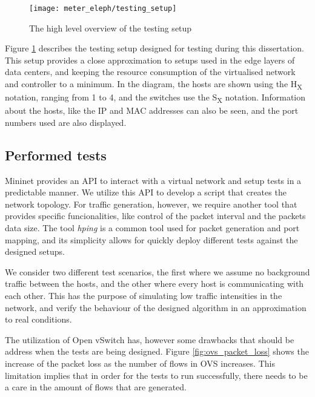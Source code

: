 \pagebreak

\begin{figure} 
    \centering
    \texttt{[image: meter\_eleph/testing\_setup]}
    \caption {The high level overview of the testing setup}
    \label{fig:test_setup}
\end{figure} 

\par Figure \ref{fig:test_setup} describes the testing setup designed for testing during this dissertation. This setup provides a close approximation to setups used in the edge layers of data centers, and keeping the
resource consumption of the virtualised network and controller to a minimum. In the diagram, the hosts are shown using the H\textsubscript{X} notation, ranging from 1 to 4, and the switches use the S\textsubscript{X} 
notation. Information about the hosts, like the IP and MAC addresses can also be seen, and the port numbers used are also displayed.

\subsection{Performed tests}

Mininet provides an API to interact with a virtual network and setup tests in a predictable manner. We utilize this API to develop a script that creates the network topology. For traffic generation, however, we require another tool that provides 
specific funcionalities, like control of the packet interval and the packets data size. The tool \textit{hping} is a common tool used for packet generation and port mapping, and its simplicity allows for quickly deploy different tests
against the designed setups.

\par We consider two different test scenarios, the first where we assume no background traffic between the hosts, and the other where every host is communicating with each other. This has the purpose of simulating low traffic intensities in the network,
and verify the behaviour of the designed algorithm in an approximation to real conditions.

\par The utilization of Open vSwitch has, however some drawbacks that should be address when the tests are being designed. Figure \ref{fig:ovs_packet_loss} shows the increase of the packet loss as the number of flows in OVS increases.
This limitation implies that in order for the tests to run successfully, there needs to be a care in the amount of flows that are generated.

